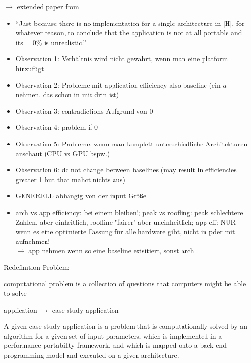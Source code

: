 \newpage
\cite{marowka_reformulation_2022}
$\rightarrow$ extended paper from \cite{marowka_toward_2021}

\begin{itemize}
    \item \enquote{Just because there is no implementation for a single architecture in |H|, for whatever reason, to conclude that the application is not at all portable and its = 0\% is unrealistic.}
    \item Observation 1: Verhältnis wird nicht gewahrt, wenn man eine platform hinzufügt
    \item Observation 2: Probleme mit application efficiency also baseline (ein $a$ nehmen, das schon in \pp mit drin ist)
    \item Observation 3: contradictions Aufgrund von 0
    \item Observation 4: problem if $0$
    \item Observation 5: Probleme, wenn man komplett unterschiedliche Architekturen anschaut (CPU vs GPU bspw.)
    \item Observation 6: do not change between baselines (may result in efficiencies greater 1 but that mahct nichts aus)
    \item \pp GENERELL abhängig von der input Größe
    \item arch vs app efficiency: bei einem bleiben!; peak vs roofling: peak schlechtere Zahlen, aber einheitlich, roofline "fairer" aber uneinheitlich; app eff: NUR wenn es eine optimierte Fassung für alle hardware gibt, nicht in \pp pder \mpp mit aufnehmen! \\$\rightarrow$ app nehmen wenn so eine baseline exisitiert, sonst arch 
\end{itemize}

Redefinition Problem: 
\begin{quotebox}
    computational problem is a collection of questions that computers might be able to solve
\end{quotebox}

application $\rightarrow$ case-study application
\begin{quotebox}
    A given case-study application is a problem that is computationally solved by an algorithm for a given set of input parameters, which is implemented in a performance portability framework, and which is mapped onto a back-end programming model and executed on a given architecture.
\end{quotebox}

